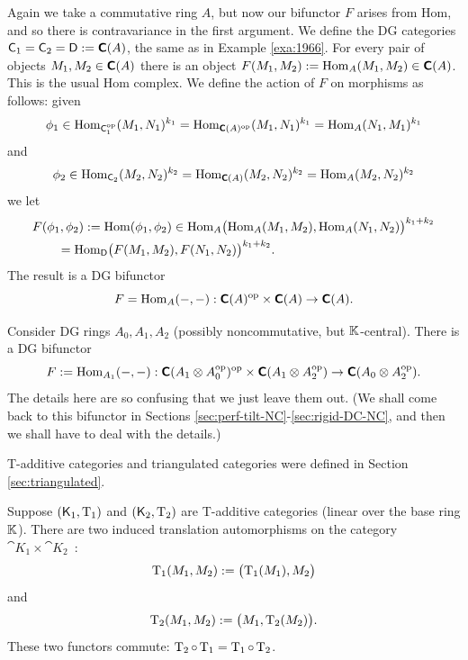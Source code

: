 \begin{exa} \label{exa:1967}
Again we take a commutative ring $A$, but now our bifunctor $F$ arises from 
Hom, and so there is contravariance in the first argument. 
We define the DG categories 
$\operatorname{\mathsf{C}}_1 = \operatorname{\mathsf{C}}_2 = \operatorname{\mathsf{D}} := \boldsymbol{\mathsf{C}}(A)$,
the same as in Example \ref{exa:1966}.
For every pair of objects 
$M_1, M_2 \in \boldsymbol{\mathsf{C}}(A)$ there is an object 
$F(M_1, M_2) := \operatorname{Hom}_{A}(M_1, M_2) \in \boldsymbol{\mathsf{C}}(A)$.
This is the usual Hom complex. 
We define the action of $F$ on morphisms as follows: given 
\[ \phi_1 \in \operatorname{Hom}_{\operatorname{\mathsf{C}}_1^{\mathrm{op}}}(M_1, N_1)^{k_1} =
\operatorname{Hom}_{\boldsymbol{\mathsf{C}}(A)^{\mathrm{op}}}(M_1, N_1)^{k_1} =
\operatorname{Hom}_{A}(N_1, M_1)^{k_1} \]
and
\[ \phi_2 \in \operatorname{Hom}_{\operatorname{\mathsf{C}}_2}(M_2, N_2)^{k_2} =
\operatorname{Hom}_{\boldsymbol{\mathsf{C}}(A)}(M_2, N_2)^{k_2} =
\operatorname{Hom}_{A}(M_2, N_2)^{k_2} \]
we let 
\[ \begin{aligned}
& F(\phi_1, \phi_2) := \operatorname{Hom}(\phi_1, \phi_2) \in
\operatorname{Hom}_{A} \bigl( \operatorname{Hom}_{A}(M_1, M_2), \operatorname{Hom}_{A}(N_1, N_2)
\bigr)^{k_1 + k_2}
\\
& \qquad = 
\operatorname{Hom}_{\operatorname{\mathsf{D}}} \bigl( F(M_1, M_2), F(N_1, N_2) \bigr)^{k_1 + k_2} .
\end{aligned} \]
The result is a DG bifunctor
\[ F = \operatorname{Hom}_A(-, -) : \boldsymbol{\mathsf{C}}(A)^{\mathrm{op}} \times \boldsymbol{\mathsf{C}}(A) \to 
\boldsymbol{\mathsf{C}}(A) . \]
\end{exa}

\begin{exa} \label{exa:1968}
Consider DG rings $A_0, A_1, A_2$ (possibly noncommutative, but 
$\mathbb{K}$-central). There is a DG bifunctor 
\[ F := \operatorname{Hom}_{A_1}(-, -) :
\boldsymbol{\mathsf{C}}(A_1 \otimes A_0^{\mathrm{op}})^{\mathrm{op}} \times 
\boldsymbol{\mathsf{C}}(A_1 \otimes A_2^{\mathrm{op}}) \to 
\boldsymbol{\mathsf{C}}(A_0 \otimes A_2^{\mathrm{op}}) . \]
The details here are so confusing that we just leave them out.
(We shall come back to this bifunctor in Sections 
\ref{sec:perf-tilt-NC}-\ref{sec:rigid-DC-NC}, 
and then we shall have to deal with the details.)
\end{exa}

 

 \label{subsec:tri-bifun}

T-additive categories and triangulated categories were defined in Section 
\ref{sec:triangulated}. 

Suppose $(\operatorname{\mathsf{K}}_1, \operatorname{T}_1)$ and $(\operatorname{\mathsf{K}}_2, \operatorname{T}_2)$ are 
T-additive categories (linear over the base ring $\mathbb{K}$). There are two induced 
translation automorphisms on the category 
$\cat{K}_1 \times \cat{K}_2$~: 
\begin{equation} \label{eqn:4050}
\operatorname{T}_1(M_1, M_2) := \bigl( \operatorname{T}_1(M_1), M_2 \bigr) 
\end{equation}
and 
\begin{equation} \label{eqn:4051}
\operatorname{T}_2(M_1, M_2) := \bigl( M_1, \operatorname{T}_2(M_2) \bigr) . 
\end{equation}
These two functors commute: 
$\operatorname{T}_2 \circ \operatorname{T}_1 = \operatorname{T}_1 \circ \operatorname{T}_2$.

